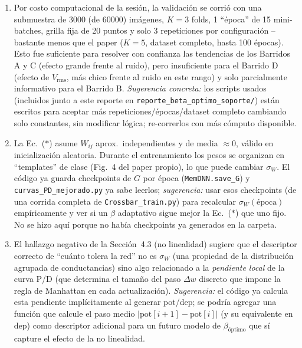 \documentclass[11pt]{article}
\begin{document}
\begin{enumerate}
  \item Por costo computacional de la sesión, la validación se corrió con una
    submuestra de 3000 (de 60000) imágenes, $K=3$ folds, 1 ``época'' de 15
    mini-batches, grilla fija de 20 puntos y solo 3 repeticiones por configuración
    --bastante menos que el paper ($K=5$, dataset completo, hasta 100 épocas). Esto
    fue suficiente para resolver con confianza las tendencias de los Barridos A y C
    (efecto grande frente al ruido), pero insuficiente para el Barrido D (efecto de
    $V_{\text{rms}}$, más chico frente al ruido en este rango) y solo parcialmente
    informativo para el Barrido B. \emph{Sugerencia concreta:} los scripts usados
    (incluidos junto a este reporte en \texttt{reporte\_beta\_optimo\_soporte/})
    están escritos para aceptar más repeticiones/épocas/dataset completo cambiando
    solo constantes, sin modificar lógica; re-correrlos con más cómputo disponible.

  \item La Ec.~($\ast$) asume $W_{ij}$ aprox.\ independientes y de media $\approx 0$,
    válido en inicialización aleatoria. Durante el entrenamiento los pesos se
    organizan en ``templates'' de clase (Fig.~4 del paper propio), lo que puede
    cambiar $\sigma_W$. El código ya guarda checkpoints de $G$ por época
    (\texttt{MemDNN.save\_G}) y \texttt{curvas\_PD\_mejorado.py} ya sabe leerlos;
    \emph{sugerencia:} usar esos checkpoints (de una corrida completa de
    \texttt{Crossbar\_train.py}) para recalcular $\sigma_W(\text{época})$
    empíricamente y ver si un $\beta$ adaptativo sigue mejor la Ec.~($\ast$) que uno
    fijo. No se hizo aquí porque no había checkpoints ya generados en la carpeta.

  \item El hallazgo negativo de la Sección~4.3 (no linealidad) sugiere que el
    descriptor correcto de ``cuánto tolera la red'' no es $\sigma_W$ (una propiedad
    de la distribución agrupada de conductancias) sino algo relacionado a la
    \emph{pendiente local} de la curva P/D (que determina el tamaño del paso
    $\Delta w$ discreto que impone la regla de Manhattan en cada actualización).
    \emph{Sugerencia:} el código ya calcula esta pendiente implícitamente al generar
    pot/dep; se podría agregar una función que calcule el paso medio
    $|\mathrm{pot}[i{+}1]-\mathrm{pot}[i]|$ (y su equivalente en dep) como descriptor
    adicional para un futuro modelo de $\beta_{\text{óptimo}}$ que sí capture el
    efecto de la no linealidad.
\end{enumerate}
\end{document}
